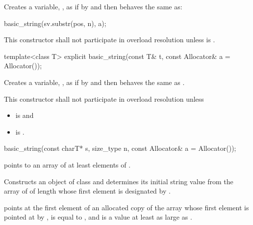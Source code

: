 \begin{itemdescr}
\pnum
\effects Creates a variable, ,
as if by 
and then behaves the same as:
\begin{codeblock}
basic_string(sv.substr(pos, n), a);
\end{codeblock}

\pnum
\remarks This constructor shall not participate in overload resolution
unless 
is .
\end{itemdescr}

%
\begin{itemdecl}
template<class T>
  explicit basic_string(const T& t, const Allocator& a = Allocator());
\end{itemdecl}

\begin{itemdescr}
\pnum
\effects Creates a variable, , as if by
 and
then behaves the same as .

\pnum
\remarks This constructor shall not participate in overload resolution unless
\begin{itemize}
\item {} is  and
\item {} is .
\end{itemize}
\end{itemdescr}

%
\begin{itemdecl}
basic_string(const charT* s, size_type n, const Allocator& a = Allocator());
\end{itemdecl}

\begin{itemdescr}
\pnum
\requires
{} points to an array of at least  elements of .

\pnum
\effects
Constructs an object of class 
and determines its initial string value from the array of
 of length  whose first element is designated by .

\pnum
\ensures
{} points at the first element of an allocated copy
of the array whose first element is pointed at by ,
 is equal to , and  is
a value at least as large as .
\end{itemdescr}

